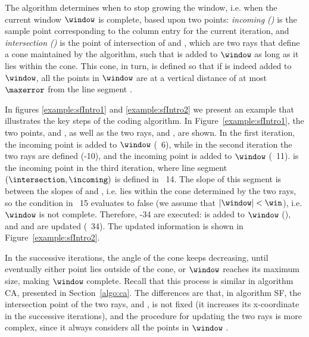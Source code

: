 The algorithm determines when to stop growing the window, i.e. when the current window $\window$ is complete, based upon two points: \textit{incoming (\incoming)} is the sample point corresponding to the column entry for the current iteration, and \textit{intersection (\intersection)} is the point of intersection of \smin and \smax, which are two rays that define a cone maintained by the algorithm, such that \incoming is added to $\window$ as long as it lies within the cone. This cone, in turn, is defined so that if \incoming is indeed added to $\window$, all the points in $\window$ are at a vertical distance of at most $\maxerror$ from the line segment \interSegmentSF.


In figures \ref{example:sfIntro1} and \ref{example:sfIntro2} we present an example that illustrates the key steps of the coding algorithm. In Figure~\ref{example:sfIntro1}, the two points, \incoming and \intersection, as well as the two rays, \smin and \smax, are shown. In the first iteration, the incoming point is added to $\window$ (\Line~6), while in the second iteration the two rays are defined (-10), and the incoming point is added to $\window$ (\Line~11). \incoming is the incoming point in the third iteration, where line segment $(\intersection, \incoming)$ is defined in \Line~14. The slope of this segment is between the slopes of \smin and \smax, i.e. \incoming lies within the cone determined by the two rays, so the condition in \Line~15 evaluates to false (we assume that $|\window|<\win$), i.e. $\window$ is not complete. Therefore, -34 are executed: \incoming is added to $\window$ (), and \smin and \smax are updated (\Line~34). The updated information is shown in Figure~\ref{example:sfIntro2}.


\vspace{+5pt}
\exampleSF


\clearpage


In the successive iterations, the angle of the cone keeps decreasing, until eventually either point \incoming lies outside of the cone, or $\window$ reaches its maximum size, making $\window$ complete. Recall that this process is similar in algorithm CA, presented in Section~\ref{algo:ca}. The differences are that, in algorithm SF, the intersection point of the two rays, \smin and \smax, is not fixed (it increases its x-coordinate in the successive iterations), and the procedure for updating the two rays is more complex, since it always considers all the points in $\window$ \cite{coder:sf}.


